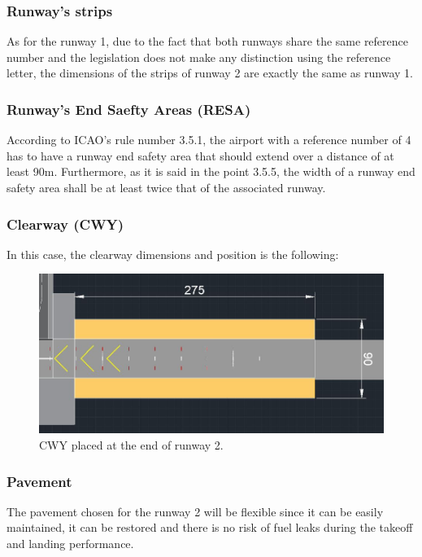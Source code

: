 	
		\subsubsection{Runway's strips}
		As for the runway 1, due to the fact that both runways share the same reference number and the legislation does not make any distinction using the reference letter, the dimensions of the strips of runway 2 are exactly the same as runway 1. 
		
		\subsubsection{Runway's End Saefty Areas (RESA)}
		According to ICAO's rule number 3.5.1, the airport with a 	reference number of 4 has to have a runway end safety area that should extend over a distance of at least 90m. Furthermore, as it is said in the point 3.5.5, the width of a runway end safety area shall be at least twice that of the associated runway. 
	
		\subsubsection{Clearway (CWY)}
		In this case, the clearway dimensions and position is the following:
	
		\begin{figure}[H]
			\centering
			\includegraphics[clip, trim=0cm 0cm 0cm 0cm, width=1\textwidth]{./images/declareddistances/CWY2}
			\caption{CWY placed at the end of runway 2.} %
			\label{} %
		\end{figure}
		
		\subsubsection{Pavement}
		The pavement chosen for the runway 2 will be flexible since it can be easily maintained, it can be restored and there is no risk of fuel leaks during the takeoff and landing performance.

